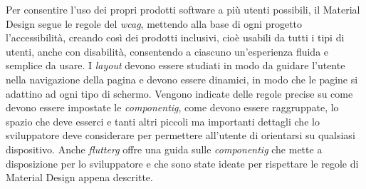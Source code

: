 \newline
Per consentire l'uso dei propri prodotti software a più utenti possibili, il Material Design segue le regole del \emph{\gls{wcag}}\glsfirstoccur, mettendo alla base di ogni progetto l'accessibilità, creando così dei prodotti inclusivi, cioè usabili da tutti i tipi di utenti, anche con disabilità, consentendo a ciascuno un'esperienza fluida e semplice da usare.\newline
\newline
I \emph{layout} devono essere studiati in modo da guidare l'utente nella navigazione della pagina e devono essere dinamici, in modo che le pagine si adattino ad ogni tipo di schermo.\newline
Vengono indicate delle regole precise su come devono essere impostate le \emph{\gls{componentig}}\glsfirstoccur, come devono essere raggruppate, lo spazio che deve esserci e tanti altri piccoli ma importanti dettagli che lo sviluppatore deve considerare per permettere all'utente di orientarsi su qualsiasi dispositivo.\newline
Anche \emph{\gls{flutterg}} offre una guida sulle \emph{\gls{componentig}} che mette a disposizione per lo sviluppatore e che sono state ideate per rispettare le regole di Material Design appena descritte.\newline

